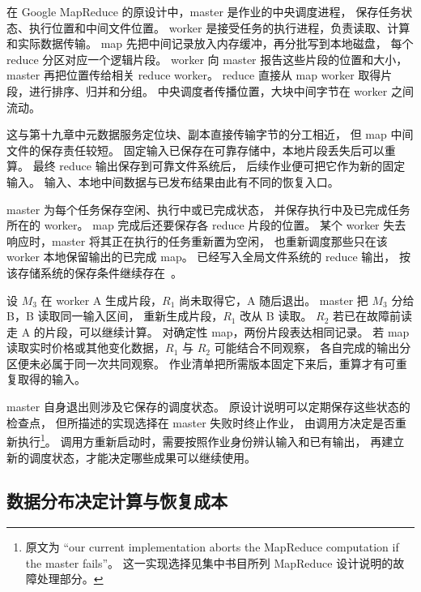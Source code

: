 
在 Google MapReduce 的原设计中，master 是作业的中央调度进程，
保存任务状态、执行位置和中间文件位置。
worker 是接受任务的执行进程，负责读取、计算和实际数据传输。
map 先把中间记录放入内存缓冲，再分批写到本地磁盘，
每个 reduce 分区对应一个逻辑片段。
worker 向 master 报告这些片段的位置和大小，
master 再把位置传给相关 reduce worker。
reduce 直接从 map worker 取得片段，进行排序、归并和分组。
中央调度者传播位置，大块中间字节在 worker 之间流动。

这与第十九章中元数据服务定位块、副本直接传输字节的分工相近，
但 map 中间文件的保存责任较短。
固定输入已保存在可靠存储中，本地片段丢失后可以重算。
最终 reduce 输出保存到可靠文件系统后，
后续作业便可把它作为新的固定输入。
输入、本地中间数据与已发布结果由此有不同的恢复入口。


master 为每个任务保存空闲、执行中或已完成状态，
并保存执行中及已完成任务所在的 worker。
map 完成后还要保存各 reduce 片段的位置。
某个 worker 失去响应时，master 将其正在执行的任务重新置为空闲，
也重新调度那些只在该 worker 本地保留输出的已完成 map。
已经写入全局文件系统的 reduce 输出，
按该存储系统的保存条件继续存在~\cite{mapreduce-design}。

设 $M_3$ 在 worker A 生成片段，$R_1$ 尚未取得它，A 随后退出。
master 把 $M_3$ 分给 B，B 读取同一输入区间，
重新生成片段，$R_1$ 改从 B 读取。
$R_2$ 若已在故障前读走 A 的片段，可以继续计算。
对确定性 map，两份片段表达相同记录。
若 map 读取实时价格或其他变化数据，$R_1$ 与 $R_2$ 可能结合不同观察，
各自完成的输出分区便未必属于同一次共同观察。
作业清单把所需版本固定下来后，重算才有可重复取得的输入。


master 自身退出则涉及它保存的调度状态。
原设计说明可以定期保存这些状态的检查点，
但所描述的实现选择在 master 失败时终止作业，
由调用方决定是否重新执行\footnote{原文为
``our current implementation aborts the MapReduce computation if the master fails''。
这一实现选择见集中书目所列 MapReduce 设计说明的故障处理部分。}。
调用方重新启动时，需要按照作业身份辨认输入和已有输出，
再建立新的调度状态，才能决定哪些成果可以继续使用。

\subsection{数据分布决定计算与恢复成本}

